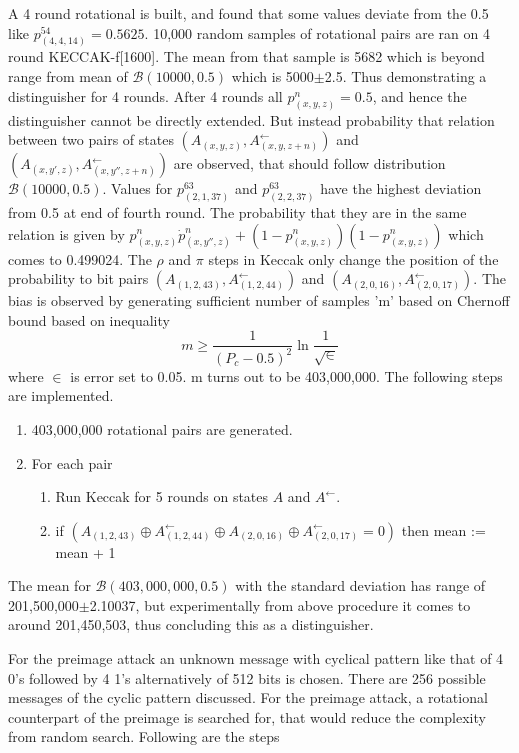 A 4 round rotational is built, and found that some values deviate from the 0.5 like $p^{54}_{(4, 4, 14)} = 0.5625$. 10,000
random samples of rotational pairs are ran on 4 round KECCAK-f[1600]. The mean from that sample is 5682 which is beyond
range from mean of $\mathcal{B}(10000, 0.5)$ which is 5000$\pm$2.5. Thus demonstrating a distinguisher for 4 rounds.
After 4 rounds all $p^n_{(x, y, z)} = 0.5$, and hence the distinguisher cannot be directly extended. But instead probability
that relation between two pairs of states $(A_{(x, y, z)}, A^{\leftarrow}_{(x, y, z+n)})$ and 
$(A_{(x, y', z)}, A^{\leftarrow}_{(x, y'', z+n)})$ are observed, that should follow distribution $\mathcal{B}(10000, 0.5)$.
Values for $p^63_{(2, 1, 37)}$ and $p^63_{(2, 2, 37)}$ have the highest deviation from 0.5 at end of fourth round. The
probability that they are in the same relation is given by $p^n_{(x, y, z)} \dot p^n_{(x, y'', z)} + (1 - p^n_{(x, y, z)})
(1 - p^n_{(x, y, z)})$ which comes to 0.499024. The $\rho$ and $\pi$ steps in Keccak only change the position of the
probability to bit pairs $(A_{(1, 2, 43)}, A^{\leftarrow}_{(1, 2, 44)})$ and $(A_{(2, 0, 16)}, A^{\leftarrow}_{(2, 0, 17)})$.
The bias is observed by generating sufficient number of samples 'm' based on Chernoff bound based on inequality 
\[ m \geq \frac{1}{(P_c - 0.5)^2} \ln \frac{1}{\sqrt \in}\]
where $\in$ is error set to 0.05. m turns out to be 403,000,000. The following steps are implemented.\cite{00022}
\begin{enumerate}
\item 403,000,000 rotational pairs are generated.
\item For each pair
  \begin{enumerate}
  \item Run Keccak for 5 rounds on states $A$ and $A^{\leftarrow}$.
  \item if $(A_{(1, 2, 43)} \oplus A^{\leftarrow}_{(1, 2, 44)} \oplus A_{(2, 0, 16)} \oplus A^{\leftarrow}_{(2, 0, 17)} = 0)$
  then \newline mean := mean + 1
  \end{enumerate}
\end{enumerate}

The mean for $\mathcal{B}(403,000,000, 0.5)$ with the standard deviation has range of 201,500,000$\pm$2.10037, but 
experimentally from above procedure it comes to around 201,450,503, thus concluding this as a distinguisher.

For the preimage attack an unknown message with cyclical pattern like that of 4 0's followed by 4 1's alternatively of
512 bits is chosen. There are 256 possible messages of the cyclic pattern discussed. For the preimage attack, a rotational
counterpart of the preimage is searched for, that would reduce the complexity from random search. Following are the steps
\cite{00022}

